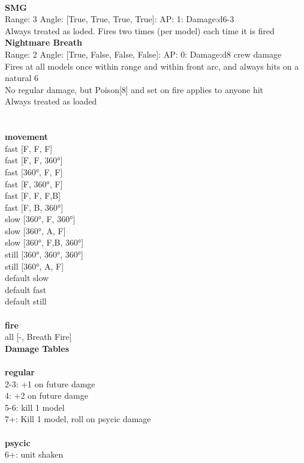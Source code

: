 \ \\
{\bf SMG } \\



Range: 3  Angle: [True, True, True, True]: AP: 1: Damage:d6-3 \\
Always treated as loded. Fires two times (per model) each time it is fired\\ 




{\bf Nightmare Breath } \\



Range: 2  Angle: [True, False, False, False]: AP: 0: Damage:d8 crew damage \\
Fires at all models once within range and within front arc, and always hits on a natural 6\\ 
No regular damage, but Poison[8] and set on fire applies to anyone hit\\ 
Always treated as loaded\\ 




 
\ \\




\ \\ {\bf movement } \\
fast [F, F, F] \\
fast [F, F, 360°] \\
fast [360°, F, F] \\
fast [F, 360°, F] \\
fast [F, F, F,B] \\
fast [F, B, 360°] \\
slow [360°, F, 360°] \\
slow [360°, A, F] \\
slow [360°, F,B, 360°] \\
still [360°, 360°, 360°] \\
still [360°, A, F] \\
default slow \\
default fast \\
default still \\
\ \\ {\bf fire } \\
all [-, Breath Fire] \\


{\bf Damage Tables} \\
\ \\ {\bf regular } \\
2-3: +1 on future damge \\
4: +2 on future damge \\
5-6: kill 1 model \\
7+: Kill 1 model, roll on psycic damage \\
\ \\ {\bf psycic } \\
6+: unit shaken \\











